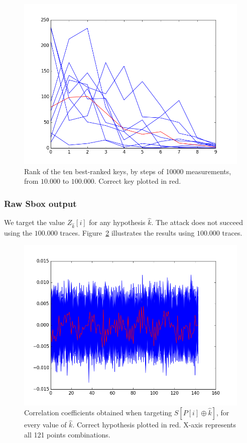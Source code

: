 \begin{figure}[H]
	\centering 
	\includegraphics[scale=0.35]{figures/convergence.png}
	\caption{Rank of the ten best-ranked keys, by steps of 10000 measurements, from $10.000$ to $100.000$. Correct key plotted in red.}
	\label{fig:convergence}
\end{figure}

\subsubsection{Raw Sbox output}
We target the value $Z_{\hat{k}}[i]$ for any hypothesis $\hat{k}$.
The attack does not succeed using the $100.000$ traces.
Figure~\ref{fig:CPA2O_averagedZ1} illustrates the results using $100.000$ traces.
\begin{figure}[H]
	\centering 
	\includegraphics[scale=0.35]{figures/CPA2O_averagedZ1.png}
	\caption{Correlation coefficients obtained when targeting $S[P[i]\oplus \hat{k}] $, for every value of $\hat{k}$. Correct hypothesis plotted in red. X-axis represents all 121 points combinations.}
	\label{fig:CPA2O_averagedZ1}
\end{figure}


